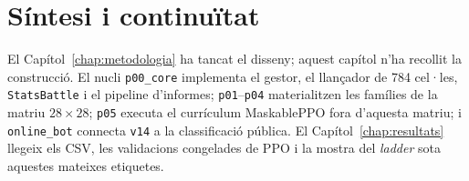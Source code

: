 \section{Síntesi i continuïtat}

El Capítol~\ref{chap:metodologia} ha tancat el disseny; aquest capítol n'ha recollit la construcció. El nucli \texttt{p00\_core} implementa el gestor, el llançador de 784 cel·les, \texttt{StatsBattle} i el pipeline d'informes; \texttt{p01}--\texttt{p04} materialitzen les famílies de la matriu $28\times 28$; \texttt{p05} executa el currículum MaskablePPO fora d'aquesta matriu; i \texttt{online\_bot} connecta \texttt{v14} a la classificació pública. El Capítol~\ref{chap:resultats} llegeix els CSV, les validacions congelades de PPO i la mostra del \emph{ladder} sota aquestes mateixes etiquetes.
